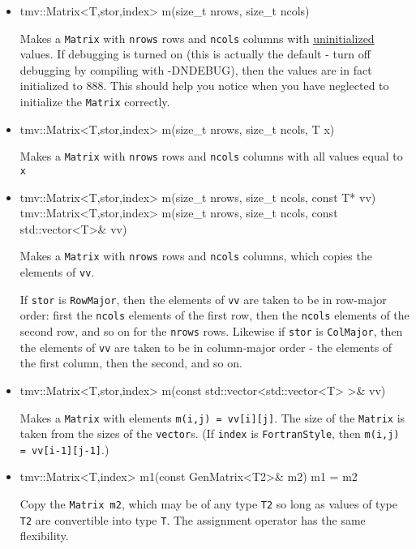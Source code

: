 \documentclass[twoside,letterpaper,11pt]{article}
\renewcommand{\tt}[1]{{\lstinline {#1}}}
\begin{document}
\begin{itemize}
\item 
\begin{tmvcode}
tmv::Matrix<T,stor,index> m(size_t nrows, size_t ncols)
\end{tmvcode}
Makes a \tt{Matrix} with \tt{nrows} rows and \tt{ncols} columns with 
\underline{uninitialized} values.
If debugging is turned on (this is actually the default -
turn off debugging by compiling
with -DNDEBUG), then the values are in fact initialized to 888.  
This should help you notice
when you have neglected to initialize the \tt{Matrix} correctly.

\item
\begin{tmvcode}
tmv::Matrix<T,stor,index> m(size_t nrows, size_t ncols, T x)
\end{tmvcode}
Makes a \tt{Matrix} with \tt{nrows} rows and \tt{ncols} columns with all 
values equal to \tt{x}

\item
\begin{tmvcode}
tmv::Matrix<T,stor,index> m(size_t nrows, size_t ncols, const T* vv)
tmv::Matrix<T,stor,index> m(size_t nrows, size_t ncols, 
      const std::vector<T>& vv)
\end{tmvcode}
Makes a \tt{Matrix} with \tt{nrows} rows and \tt{ncols} columns,
which copies the elements of \tt{vv}.

If \tt{stor} is \tt{RowMajor}, then the elements of \tt{vv} are taken to
be in row-major order: first the \tt{ncols} elements of the first row, then the
\tt{ncols} elements of the second row, and so on for the \tt{nrows} rows.
Likewise if \tt{stor} is \tt{ColMajor},
then the elements of \tt{vv} are taken to be in column-major order - 
the elements of the first column, then the second, and so on.

\item
\begin{tmvcode}
tmv::Matrix<T,stor,index> m(const std::vector<std::vector<T> >& vv)
\end{tmvcode}
Makes a \tt{Matrix} with elements \tt{m(i,j) = vv[i][j]}.  The size of
the \tt{Matrix} is taken from the sizes of the \tt{vector}s.  
(If \tt{index} is \tt{FortranStyle}, then \tt{m(i,j) = vv[i-1][j-1]}.)

\item
\begin{tmvcode}
tmv::Matrix<T,index> m1(const GenMatrix<T2>& m2)
m1 = m2
\end{tmvcode}
Copy the \tt{Matrix m2}, which may be of any type \tt{T2} so long
as values of type \tt{T2} are convertible into type \tt{T}.
The assignment operator has the same flexibility.


\end{itemize}
\end{document}
